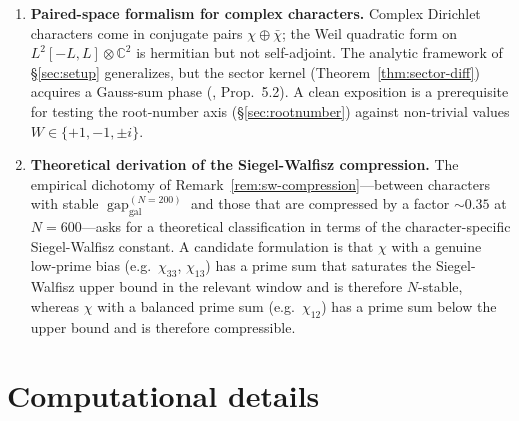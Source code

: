 \documentclass[a4paper,10pt,twocolumn]{article}
\theoremstyle{definition}
\theoremstyle{remark}
\newcommand{\gap}{\operatorname{gap}}
\newcommand{\chifn}{\chi}
\begin{document}
\begin{enumerate}
    of CCX13 compute per ten characters, a one-weekend job.
  \item \textbf{Paired-space formalism for complex characters.}
    Complex Dirichlet characters come in conjugate pairs
    $\chifn\oplus\bar\chifn$; the Weil quadratic form on
    $L^2[-L,L]\otimes\mathbb{C}^2$ is hermitian but not
    self-adjoint. The analytic framework of \S\ref{sec:setup}
    generalizes, but the sector kernel
    (Theorem~\ref{thm:sector-diff}) acquires a Gauss-sum phase
    (\cite{AnalyticKernel}, Prop.~5.2). A clean exposition is
    a prerequisite for testing the root-number axis
    (\S\ref{sec:rootnumber}) against non-trivial values $W\in
    \{+1,-1,\pm i\}$.
  \item \textbf{Theoretical derivation of the Siegel-Walfisz
    compression.} The empirical dichotomy of
    Remark~\ref{rem:sw-compression}---between characters with
    stable $\gap_{\mathrm{gal}}^{(N=200)}$ and those that are
    compressed by a factor $\sim 0.35$ at $N=600$---asks for a
    theoretical classification in terms of the character-specific
    Siegel-Walfisz constant. A candidate formulation is that
    $\chifn$ with a genuine low-prime bias (e.g.\ $\chifn_{33}$,
    $\chifn_{13}$) has a prime sum that saturates the
    Siegel-Walfisz upper bound in the relevant window and is
    therefore $N$-stable, whereas $\chifn$ with a balanced prime
    sum (e.g.\ $\chifn_{12}$) has a prime sum below the upper
    bound and is therefore compressible.
\end{enumerate}

\appendix

\section{Computational details}
\label{app:computation}
\end{document}
